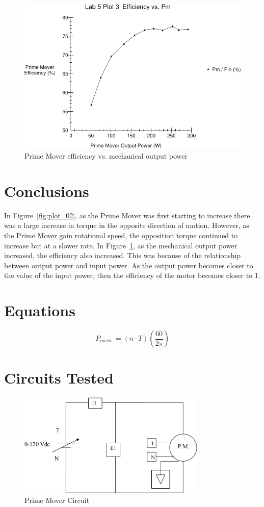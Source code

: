 \documentclass{article}
\begin{document}
\begin{figure}[H]
  \centering
  \includegraphics[width=\textwidth]{img/plot3}
  \caption{Prime Mover efficiency vs. mechanical output power}
  \label{fig:plot_03}
\end{figure}

\section{Conclusions}
In Figure~\ref{fig:plot_02}, as the Prime Mover was first starting to increase there was a large increase
in torque in the opposite direction of motion. However, as the Prime Mover gain rotational speed, the 
opposition torque continued to increase but at a slower rate. In Figure~\ref{fig:plot_03}, as the mechanical
output power increased, the efficiency also increased. This was because of the relationship between output
power and input power. As the output power becomes closer to the value of the input power, then the efficiency 
of the motor becomes closer to 1. 




\section*{Equations}

\[P_{mech}\ =  (n \cdot T)\left(\frac{60}{2\pi}\right) \]

\section*{Circuits Tested}

\begin{figure}[H]
  \centering
  \includegraphics[width=0.8\textwidth]{img/circuit_01}
  \caption{Prime Mover Circuit}
  \label{fig:circuit_01}
\end{figure}
\end{document}
